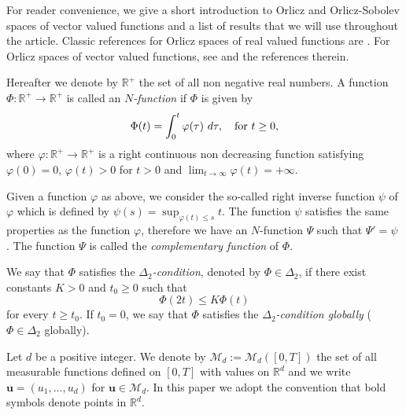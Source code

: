 \documentclass[twoside]{article}
\theoremstyle{remark}
\renewcommand{\b}[1]{\boldsymbol{#1}}
\renewcommand{\leq}{\leqslant}
\begin{document}
For reader convenience, we give a short introduction to Orlicz and Orlicz-Sobolev spaces of vector valued functions and a  list  of results that we will use throughout the article. 
Classic references for Orlicz spaces of real valued functions are \cite{adams_sobolev,KR,rao1991theory}.
For  Orlicz spaces of vector valued functions, see \cite{Orliczvectorial2005} and the references therein.

Hereafter we denote  by $\mathbb{R}^+$  the set of all non negative real numbers. A function $\Phi:\mathbb{R}^+\to \mathbb{R}^+ $ is called an \emph{$N$-function} if $\Phi$ is given by 
\[
\Phi(t)=\int_{0}^t \varphi(\tau)\ d\tau,\quad\hbox{for } t\geq 0,
\]
where $\varphi:\mathbb{R}^+\rightarrow \mathbb{R}^+$ is a right continuous non decreasing function  satisfying   $\varphi(0)=0$, $\varphi(t)>0$ for $t>0$ and
$\lim_{t\rightarrow \infty}\varphi(t)=+\infty$.

Given a function $\varphi$ as above, we  consider the so-called right inverse function $\psi$ of $\varphi$ which is 
defined by $\psi(s)=\sup_{\varphi(t)\leq s}t$.
The function $\psi$ satisfies the same properties as the function $\varphi$, therefore we have an $N$-function $\Psi$ such that $\Psi'=\psi$ .
 The function $\Psi$ is called the \emph{complementary function} of $\Phi$.


We say that $\Phi$ satisfies the  \emph{$\Delta_2$-condition}, denoted by $\Phi \in \Delta_2$, 
if there exist  constants $K>0$ and  $t_0\geq 0$ such that 
\begin{equation}\label{delta2defi}\Phi(2t)\leq K\Phi(t)
\end{equation}
for every $t\geq t_0$. 
If $t_0=0$,  we say that $\Phi$ satisfies the \emph{$\Delta_2$-condition globally} ($\Phi \in \Delta_2$ globally).  


Let $d$ be a positive integer. We denote by $\mathcal{M}_d:=\mathcal{M}_d([0,T])$ the set of all measurable functions defined on $[0,T]$ with values on $\mathbb{R}^d$ and  we write $\b{u}=(u_1,\dots,u_d)$ for  $\b{u}\in \mathcal{M}_d$.
In this paper we adopt the convention that bold symbols denote points in $\mathbb{R}^d$.
\end{document}

